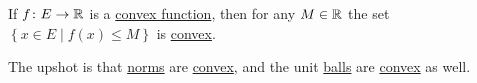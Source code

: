 \begin{remark}
	If \(f\colon E \to \mathbb{\MakeUppercase{r}} \) is a \hyperref[def:convex-function]{convex function}, then for any \(M\in \mathbb{\MakeUppercase{r}} \) the set \(\left\{ x\in E\mid f(x) \leq M \right\} \) is \hyperref[def:convex-set]{convex}.
\end{remark}

The upshot is that \hyperref[def:norm]{norms} are \hyperref[def:convex-function]{convex}, and the unit \hyperref[def:ball]{balls} are \hyperref[def:convex-set]{convex} as well.
